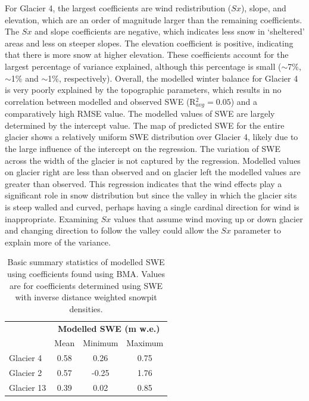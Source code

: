 \documentclass[12pt]{article}
\begin{document}
For Glacier 4, the largest coefficients are wind redistribution ($Sx$), slope, and elevation, which are an order of magnitude larger than the remaining coefficients. The $Sx$ and slope coefficients are negative, which indicates less snow in `sheltered' areas and less on steeper slopes. The elevation coefficient is positive, indicating that there is more snow at higher elevation. These coefficients account for the largest percentage of variance explained, although this percentage is small ($\sim$7\%, $\sim$1\% and $\sim$1\%, respectively). Overall, the modelled winter balance for Glacier 4 is very poorly explained by the topographic parameters, which results in no correlation between modelled and observed SWE (R$^2_{avg}=0.05$) and a comparatively high RMSE value. The modelled values of SWE are largely determined by the intercept value. The map of predicted SWE for the entire glacier shows a relatively uniform SWE distribution over Glacier 4, likely due to the large influence of the intercept on the regression. The variation of SWE across the width of the glacier is not captured by the regression. Modelled values on glacier right are less than observed and on glacier left the modelled values are greater than observed. This regression indicates that the wind effects play a significant role in snow distribution but since the valley in which the glacier sits is steep walled and curved, perhaps having a single cardinal direction for wind is inappropriate. Examining $Sx$ values that assume wind moving up or down glacier and changing direction to follow the valley could allow the $Sx$ parameter to explain more of the variance. 
\begin{table}
\centering
\caption{Basic summary statistics of modelled SWE using coefficients found using BMA. Values are for coefficients determined using SWE with inverse distance weighted snowpit densities. }
\label{tab:BMSsweMinMax}
\begin{tabular}{lccc}
\multicolumn{1}{l}{} & \multicolumn{3}{c}{\textbf{Modelled SWE (m w.e.)}} \\
                     & Mean          & Minimum          & Maximum         \\ \hline
Glacier 4            & 0.58          & 0.26             & 0.75            \\
Glacier 2            & 0.57          & -0.25            & 1.76            \\
Glacier 13           & 0.39          & 0.02             & 0.85           
\end{tabular}
\end{table} 
\end{document}

